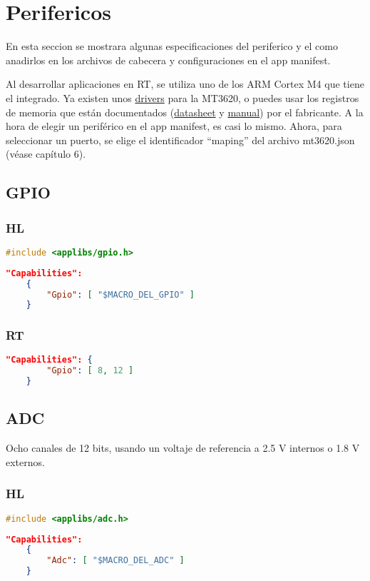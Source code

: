 \section{Perifericos}
En esta seccion se mostrara algunas especificaciones del periferico y el como anadirlos en los archivos de cabecera y configuraciones en el app manifest.\par
Al desarrollar aplicaciones en RT, se utiliza uno de los ARM Cortex M4 que tiene el integrado. Ya existen unos \href{https://github.com/CodethinkLabs/mt3620-m4-drivers/tree/master}{drivers} para la MT3620, o puedes usar los registros de memoria que están documentados (\href{https://d86o2zu8ugzlg.cloudfront.net/mediatek-craft/documents/mt3620/MT3620-Datasheet-v1.7.pdf}{datasheet} y
\href{https://d86o2zu8ugzlg.cloudfront.net/mediatek-craft/documents/MT3620-M4-User-Manual.pdf}{manual}) por el fabricante. A la hora de elegir un periférico en el app manifest, es casi lo mismo. Ahora, para seleccionar un puerto, se elige el identificador ``maping'' del archivo mt3620.json (véase capítulo 6).


\subsection{GPIO}
\subsubsection{HL}
\begin{lstlisting}[language = C, firstnumber=0]
	#include <applibs/gpio.h>
\end{lstlisting}
\begin{lstlisting}[language = json, firstnumber=0]	
	"Capabilities": 
	{  
		"Gpio": [ "$MACRO_DEL_GPIO" ] 
	}
\end{lstlisting}
\subsubsection{RT}
\begin{lstlisting}[language = json, firstnumber=0]	
	"Capabilities": {
		"Gpio": [ 8, 12 ]
	}
\end{lstlisting}

\subsection{ADC}
Ocho canales de 12 bits, usando un voltaje de referencia a 2.5 V internos o 1.8 V externos.
\subsubsection{HL}
\begin{lstlisting}[language = C, firstnumber=0]
	#include <applibs/adc.h>
\end{lstlisting}
\begin{lstlisting}[language = json, firstnumber=0]	
	"Capabilities": 
	{  
		"Adc": [ "$MACRO_DEL_ADC" ] 
	}
\end{lstlisting}
